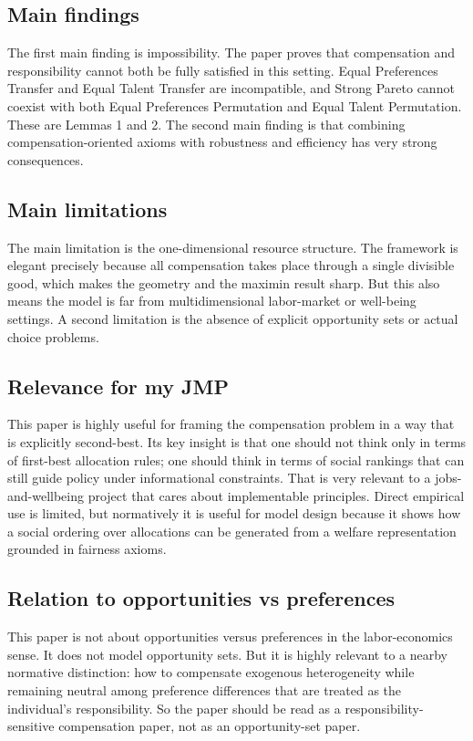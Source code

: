 \documentclass[11pt,a4paper]{article}
\begin{document}
\subsection*{Main findings}
The first main finding is impossibility. The paper proves that compensation and responsibility cannot both be fully satisfied in this setting. Equal Preferences Transfer and Equal Talent Transfer are incompatible, and Strong Pareto cannot coexist with both Equal Preferences Permutation and Equal Talent Permutation. These are Lemmas 1 and 2. The second main finding is that combining compensation-oriented axioms with robustness and efficiency has very strong consequences.

\subsection*{Main limitations}
The main limitation is the one-dimensional resource structure. The framework is elegant precisely because all compensation takes place through a single divisible good, which makes the geometry and the maximin result sharp. But this also means the model is far from multidimensional labor-market or well-being settings. A second limitation is the absence of explicit opportunity sets or actual choice problems.

\subsection*{Relevance for my JMP}
This paper is highly useful for framing the compensation problem in a way that is explicitly second-best. Its key insight is that one should not think only in terms of first-best allocation rules; one should think in terms of social rankings that can still guide policy under informational constraints. That is very relevant to a jobs-and-wellbeing project that cares about implementable principles. Direct empirical use is limited, but normatively it is useful for model design because it shows how a social ordering over allocations can be generated from a welfare representation grounded in fairness axioms.

\subsection*{Relation to opportunities vs preferences}
This paper is not about opportunities versus preferences in the labor-economics sense. It does not model opportunity sets. But it is highly relevant to a nearby normative distinction: how to compensate exogenous heterogeneity while remaining neutral among preference differences that are treated as the individual’s responsibility. So the paper should be read as a responsibility-sensitive compensation paper, not as an opportunity-set paper.
\end{document}
